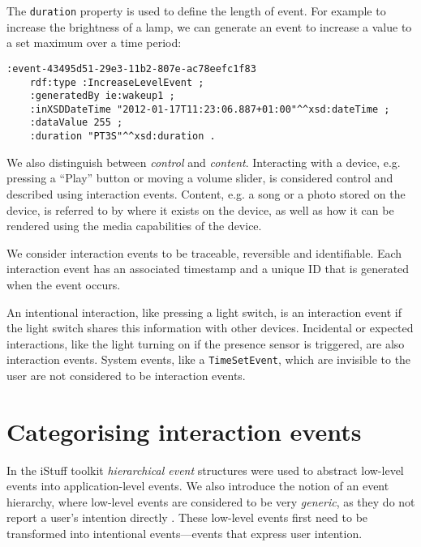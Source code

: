 The \texttt{duration} property is used to define the length of event. For example to increase the brightness of a lamp, we can generate an event to increase a value to a set maximum over a time period:

\begin{verbatim}
:event-43495d51-29e3-11b2-807e-ac78eefc1f83 
	rdf:type :IncreaseLevelEvent ;
	:generatedBy ie:wakeup1 ;
	:inXSDDateTime "2012-01-17T11:23:06.887+01:00"^^xsd:dateTime ;
	:dataValue 255 ;
	:duration "PT3S"^^xsd:duration .
\end{verbatim}


We also distinguish between \emph{control} and \emph{content}. Interacting with a device, e.g. pressing a ``Play'' button or moving a volume slider, is considered control and described using interaction events. Content, e.g. a song or a photo stored on the device,  is referred to by where it exists on the device, as well as how it can be rendered using the media capabilities of the device. 

We consider interaction events to be traceable, reversible and identifiable. Each interaction event has an associated timestamp and a unique ID that is generated when the event occurs. 

An intentional interaction, like pressing a light switch, is an interaction event if the light switch shares this information with other devices. Incidental or expected interactions, like the light turning on if the presence sensor is triggered, are also interaction events. System events, like a \texttt{TimeSetEvent}, which are invisible to the user are not considered to be interaction events.

\section{Categorising interaction events}

In the iStuff toolkit \cite{Ballagas2003} \emph{hierarchical event} structures were used to abstract low-level events into application-level events.  We also introduce the notion of an event hierarchy, where low-level events are considered to be very \emph{generic}, as they do not report a user's intention directly \cite{Niezen2011}. These low-level events first need to be transformed into intentional events---events that express user intention.

